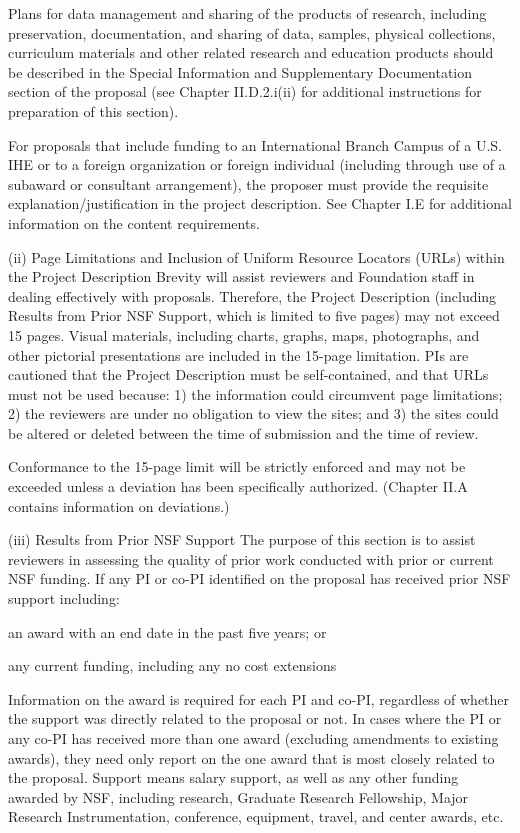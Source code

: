 {Plans for data management and sharing of the products of research, including 
preservation, documentation, and sharing of data, samples, physical 
collections, curriculum materials and other related research and education 
products should be described in the Special Information and Supplementary 
Documentation section of the proposal (see Chapter II.D.2.i(ii) for additional 
instructions for preparation of this section).

For proposals that include funding to an International Branch Campus of a U.S. 
IHE or to a foreign organization or foreign individual (including through use 
of a subaward or consultant arrangement), the proposer must provide the 
requisite explanation/justification in the project description. See Chapter I.E 
for additional information on the content requirements.

(ii) Page Limitations and Inclusion of Uniform Resource Locators (URLs) within 
the Project Description
Brevity will assist reviewers and Foundation staff in dealing effectively with 
proposals. Therefore, the Project Description (including Results from Prior NSF 
Support, which is limited to five pages) may not exceed 15 pages. Visual 
materials, including charts, graphs, maps, photographs, and other pictorial 
presentations are included in the 15-page limitation. PIs are cautioned that 
the Project Description must be self-contained, and that URLs must not be used 
because: 1) the information could circumvent page limitations; 2) the reviewers 
are under no obligation to view the sites; and 3) the sites could be altered or 
deleted between the time of submission and the time of review.

Conformance to the 15-page limit will be strictly enforced and may not be 
exceeded unless a deviation has been specifically authorized. (Chapter II.A 
contains information on deviations.)

(iii) Results from Prior NSF Support
The purpose of this section is to assist reviewers in assessing the quality of 
prior work conducted with prior or current NSF funding. If any PI or co-PI 
identified on the proposal has received prior NSF support including:

an award with an end date in the past five years; or

any current funding, including any no cost extensions

Information on the award is required for each PI and co-PI, regardless of 
whether the support was directly related to the proposal or not. In cases where 
the PI or any co-PI has received more than one award (excluding amendments to 
existing awards), they need only report on the one award that is most closely 
related to the proposal. Support means salary support, as well as any other 
funding awarded by NSF, including research, Graduate Research Fellowship, Major 
Research Instrumentation, conference, equipment, travel, and center awards, etc.

}
